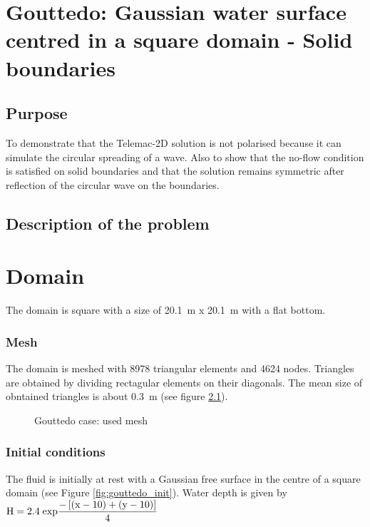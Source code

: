 \chapter{Gouttedo: Gaussian water surface centred in a square domain - Solid boundaries}
%
%
\section{Purpose}
%
To demonstrate that the Telemac-2D solution is not polarised because it can
simulate the circular spreading of a wave. Also to show that the no-flow
condition is satisfied on solid boundaries and that the solution remains
symmetric after reflection of the circular wave on the boundaries.

%
\section{Description of the problem}
%
\chapter{Domain}
The domain is square with a size of  20.1~m x 20.1~m with a flat bottom.
\subsection{Mesh}
The domain is meshed with 8978 triangular elements and 4624 nodes. Triangles
are obtained by dividing rectagular elements on their diagonals. The mean size
of obntained triangles is about 0.3~m (see figure \ref{fig:gouttedo_mesh}).
\begin{figure}[h]
\begin{center}
\end{center}
\caption{Gouttedo case: used mesh}
\label{fig:gouttedo_mesh}

\end{figure}

\subsection{Initial conditions}
The fluid is initially at rest with a Gaussian free surface in the centre of a
square domain (see Figure \ref{fig:gouttedo_init}). Water depth is given by
${\rm H= 2.4\; exp}\dfrac{{\rm -}\left[{\rm (x-10)}+({\rm y-10)}\right]}{{\rm 4}} $

